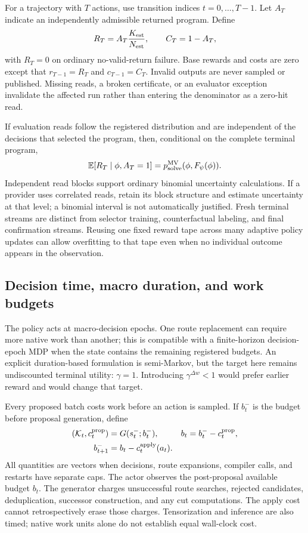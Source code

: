 \documentclass[11pt,a4paper]{article}
\newcommand{\E}{\mathbb{E}}
\theoremstyle{definition}\newtheorem{definition}[proposition]{Definition}
\begin{document}
For a trajectory with \(T\) actions, use transition indices \(t=0,\ldots,T-1\). Let \(A_T\)
indicate an independently admissible returned program. Define
\begin{equation}
 R_T=A_T\frac{K_{\rm est}}{N_{\rm est}},\qquad C_T=1-A_T,
 \label{eq:rl-terminal-outcome}
\end{equation}
with \(R_T=0\) on ordinary no-valid-return failure. Base rewards and costs are zero except that
\(r_{T-1}=R_T\) and \(c_{T-1}=C_T\). Invalid outputs are never sampled or published. Missing
reads, a broken certificate, or an evaluator exception invalidate the affected run rather than
entering the denominator as a zero-hit read.

If evaluation reads follow the registered distribution and are independent of the decisions that
selected the program, then, conditional on the complete terminal program,
\begin{equation}
 \E[R_T\mid\phi,A_T=1]
 =p_{\mathrm{solve}}^{\rm MV}(\phi,F_\psi(\phi)).
 \label{eq:rl-reward-unbiased}
\end{equation}
Independent read blocks support ordinary binomial uncertainty calculations. If a provider uses
correlated reads, retain its block structure and estimate uncertainty at that level; a binomial
interval is not automatically justified. Fresh terminal streams are distinct from selector training,
counterfactual labeling, and final confirmation streams. Reusing one fixed reward tape across many
adaptive policy updates can allow overfitting to that tape even when no individual outcome appears
in the observation.

\subsection{Decision time, macro duration, and work budgets}

The policy acts at macro-decision epochs. One route replacement can require more native work than
another; this is compatible with a finite-horizon decision-epoch MDP when the state contains the
remaining registered budgets. An explicit duration-based formulation is semi-Markov, but the target
here remains undiscounted terminal utility: \(\gamma=1\). Introducing \(\gamma^{\Delta w}<1\)
would prefer earlier reward and would change that target.

Every proposed batch costs work before an action is sampled. If \(b_t^-\) is the budget before
proposal generation, define
\begin{align}
 (\mathcal K_t,c_t^{\rm prop})&=G(s_t^-;b_t^-), &
 b_t&=b_t^- -c_t^{\rm prop},\\
 b_{t+1}^-&=b_t-c_t^{\rm apply}(a_t). &&
 \label{eq:rl-budget-accounting}
\end{align}
All quantities are vectors when decisions, route expansions, compiler calls, and restarts have
separate caps. The actor observes the post-proposal available budget \(b_t\). The generator charges
unsuccessful route searches, rejected candidates, deduplication, successor construction, and any
cut computations. The apply cost cannot retrospectively erase those charges. Tensorization and
inference are also timed; native work units alone do not establish equal wall-clock cost.
\end{document}
